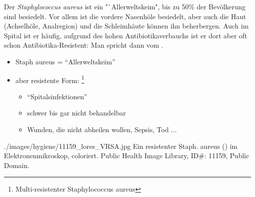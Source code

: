 {
Der \emph{Staphylococcus aureus} ist ein "`Allerweltskeim", bis zu 50\% der
Bevölkerung sind besiedelt. Vor allem ist die vordere Nasenhöle besiedelt, aber
auch die Haut (Achselhöle, Analregion) und die Schleimhäute können ihn
beherbergen. Auch im Spital ist er häufig, aufgrund des hohen
Antibiotikaverbauchs ist er dort aber oft schon Antibiotika-Resistent: Man
spricht dann vom .
}{
\begin{itemize}
    \item Staph aureus = "`Allerweltskeim"'
    \item aber resistente Form:
    \footnote{Multi-resistenter Staphylococcus aureus}
    \begin{itemize}
        \item {\textquotedblleft}Spitalsinfektionen{\textquotedblright}
        \item schwer bis gar nicht behandelbar
        \item Wunden, die nicht abheilen wollen, Sepsis, Tod ...
    \end{itemize}
\end{itemize}
}
{./images/hygiene/11159_lores_VRSA.jpg}
{Ein
resistenter Staph. aureus () im Elektronenmikroskop,
coloriert.}
{Public Health Image Library, ID\#: 11159, Public Domain.}



